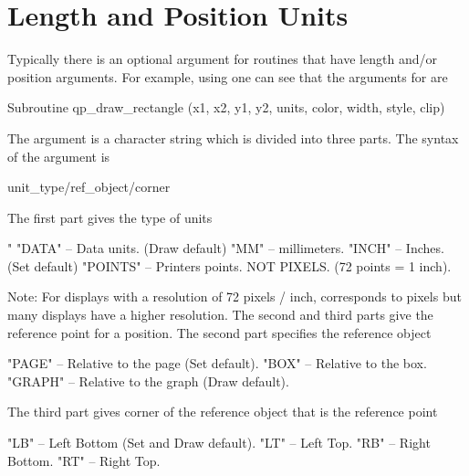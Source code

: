 \section{Length and Position Units}
\label{s:plot.units}

Typically there is an optional  argument for \quickplot routines that
have length and/or position arguments. For example, using  one can
see that the arguments for  are
\begin{example}
  Subroutine qp_draw_rectangle (x1, x2, y1, y2, units, color, width, style, clip)
\end{example}
The  argument is a character string which is divided into three
parts. The syntax of the  argument is
\begin{example}
  unit_type/ref_object/corner
\end{example}
The first part  gives the type of units
\begin{example}
  "%
  "DATA"    -- Data units. (Draw default)
  "MM"      -- millimeters.
  "INCH"    -- Inches. (Set default)
  "POINTS"  -- Printers points. NOT PIXELS. (72 points = 1 inch).
\end{example}
Note: For displays with a resolution of 72 pixels / inch,  corresponds to pixels but
many displays have a higher resolution.
The second and third parts give the reference point for a position.
The second part specifies the reference object
\begin{example}
    "PAGE"  -- Relative to the page (Set default).
    "BOX"   -- Relative to the box.
    "GRAPH" -- Relative to the graph (Draw default).
\end{example}
The third part gives corner of the reference object that is the reference point
\begin{example}
    "LB"    -- Left Bottom (Set and Draw default).
    "LT"    -- Left Top.
    "RB"    -- Right Bottom.
    "RT"    -- Right Top.
\end{example}

